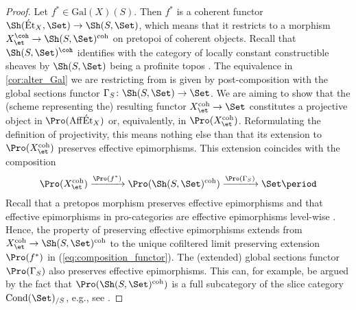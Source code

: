 \documentclass[leqno]{article}
\renewcommand{\Gal}{\mathrm{Gal}}
\DeclareMathOperator{\Cond}{Cond}
\newcommand{\CondSet}{\Cond(\Set)}
\newcommand{\Extr}{\categ{Extr}}
\newcommand{\Et}[1]{\mathrm{\acute{E}t}_{#1}}
\begin{document}
%
%
\begin{proof}
Let $f^*\in \Gal(X)(S)$. Then $f^*$ is a coherent functor $\Sh(\Et{X},\Set)\rightarrow \Sh(S,\Set)$, which means that it restricts to a morphism $X_{\et}^{\coh}\rightarrow \Sh(S,\Set)^{\mathrm{coh}}$ on pretopoi of coherent objects. Recall that $\Sh(S, \Set)^{\coh}$ identifies with the category of locally constant constructible sheaves by $\Sh(S,\Set)$ being a profinite topos \cite[Example E.2.4.6., Proposition E.2.5.6]{SAG}.
The equivalence in \cref{cor:alter_Gal} we are restricting from is given by post-composition with the global sections functor $\Gamma_S\colon \Sh(S,\Set)\rightarrow \Set$. We are aiming to show that the (scheme representing the) resulting functor 
$X_{\et}^{\mathrm{coh}}\rightarrow \Set$ constitutes a projective object in $\Pro(\mathrm{Aff}\Et{X})$ or, equivalently, in $\Pro(X_{\et}^{\mathrm{coh}})$.
Reformulating the definition of projectivity, this means nothing else than that its extension to $\Pro(X_{\et}^{\mathrm{coh}})$ preserves effective epimorphisms.
This extension coincides with the composition
\begin{align}\label{eq:composition_functor}
 \Pro(X_{\et}^{\mathrm{coh}}) \xrightarrow{\Pro(f^*)}\Pro(\Sh(S,\Set)^{\mathrm{coh}})\xrightarrow{\Pro(\Gamma_S)} \Set \period   
\end{align}
Recall that a pretopos morphism preserves effective epimorphisms and that effective epimorphisms in pro-categories are effective epimorphisms level-wise \cite[Proposition 6.1.15]{Ultracategories}.
Hence, the property of preserving effective epimorphisms extends from $X_{\et}^{\mathrm{coh}}\rightarrow \Sh(S,\Set)^{\mathrm{coh}}$ to the unique cofiltered limit preserving extension $\Pro(f^*)$ in (\ref{eq:composition_functor}).
The (extended) global sections functor $\Pro(\Gamma_S)$ also preserves effective epimorphisms.
This can, for example, be argued by the fact that $\Pro(\Sh(S,\Set)^{\mathrm{coh}})$ is a full subcategory of the slice category $\CondSet_{/S}$, e.g., see \cite[Remark 3.27, Proposition 3.32]{MR4574234}.

\end{proof}
\end{document}
